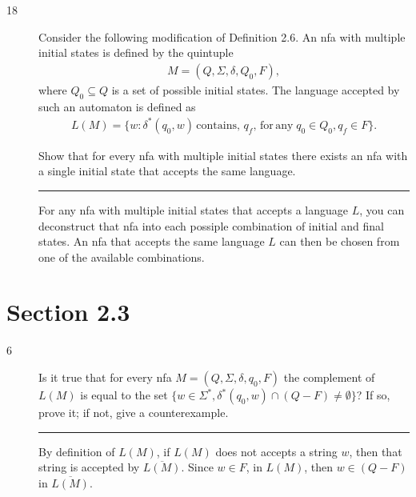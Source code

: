 \documentclass[12pt]{article}
\begin{document}
\begin{description}

    \item[18] Consider the following modification of Definition 2.6. An nfa
        with multiple initial states is defined by the quintuple
        \begin{align*}
            M = (Q, \Sigma, \delta, Q_0, F),
        \end{align*}
        where $Q_0 \subseteq Q$ is a set of possible initial states. The
        language accepted by such an automaton is defined as
        \begin{align*}
            L(M) = \{w: \delta^*(q_0,w)\, \mathrm{contains},\, q_f,\,
                     \mathrm{for\, any}\; q_0 \in Q_0, q_f \in F\}.
        \end{align*}

        Show that for every nfa with multiple initial states there exists an
        nfa with a single initial state that accepts the same
        language.

        \hrule

        For any nfa with multiple initial states that accepts a language
        $L$, you can deconstruct that nfa into each possiple combination
        of initial and final states. An nfa that accepts the same
        language $L$ can then be chosen from one of the available
        combinations.
\end{description}

\section*{Section 2.3}
\begin{description}
    \item[6] Is it true that for every nfa
        $M = (Q, \Sigma, \delta, q_0, F)$ the complement of $L(M)$ is
        equal to the set 
        $\{w \in \Sigma^*, \delta^*(q_0, w) \cap (Q - F) \ne \emptyset\}$?
        If so, prove it; if not, give a counterexample.

        \hrule

        By definition of $L(M)$, if $L(M)$ does not accepts a string
        $w$, then that string is accepted by $\overline{L(M)}$. Since
        $w \in F$, in $L(M)$, then $w \in (Q - F)$ in $\overline{L(M)}$.
        
\end{description}
\end{document}
